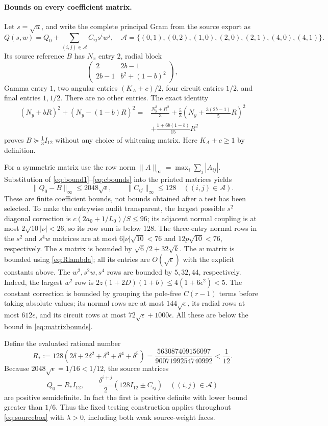 \paragraph{Bounds on every coefficient matrix.}
Let $s=\sqrt u$, and write the complete principal Gram from the
source export as
\[
 Q(s,w)=Q_0+\sum_{(i,j)\in\mathcal A}C_{ij}s^iw^j,
 \quad
 \mathcal A=\{(0,1),(0,2),(1,0),(2,0),(2,1),(4,0),(4,1)\}.
\]
Its source reference $B$ has $N_x$ entry $2$, radial block
\[
 \begin{pmatrix}2&2b-1\\2b-1&b^2+(1-b)^2\end{pmatrix},
\]
Gamma entry $1$, two angular entries $(K_A+c)/2$, four circuit
entries $1/2$, and final entries $1,1/2$. There are no other
entries. The exact identity
\begin{align*}
 (N_y+bR)^2+(N_y-(1-b)R)^2
 ={}&\frac{N_y^2+R^2}{3}
 +\frac53\left(N_y+\frac{3(2b-1)}5R\right)^2\\
 &+\frac{1+6b(1-b)}{15}R^2
\end{align*}
proves $B\succeq\frac13I_{12}$ without any choice of whitening matrix.
Here $K_A+c\ge1$ by definition.

For a symmetric matrix use the row norm
$\|A\|_\infty=\max_i\sum_j|A_{ij}|$.
Substitution of \eqref{eq:bound1}--\eqref{eq:cbounds} into the
printed matrices yields
\begin{equation}\label{eq:matrixbounds}
 \|Q_0-B\|_\infty\le2048\sqrt\epsilon,\qquad
 \|C_{ij}\|_\infty\le128\quad((i,j)\in\mathcal A).
\end{equation}
These are finite coefficient bounds, not bounds obtained after a test
has been selected. To make the entrywise audit transparent, the
largest possible $s^2$ diagonal correction is
$c(2a_0+1/L_0)/S\le96$; its adjacent normal coupling is at most
$2\sqrt{10}|\nu|<26$, so its row sum is below $128$.
The three-entry normal rows in the $s^2$ and $s^4w$ matrices are at
most $6|\nu|\sqrt{10}<76$ and $12p\sqrt{10}<76$, respectively.
The $s$ matrix is bounded by $\sqrt6/2+32\sqrt{k}$.
The $w$ matrix is bounded using \eqref{eq:Rlambda}; all its entries
are $O(\sqrt\epsilon)$ with the explicit constants above.
The $w^2,s^2w,s^4$ rows are bounded by $5,32,44$, respectively.
Indeed, the largest $w^2$ row is
$2z(1+2D)(1+b)\le4(1+6\epsilon^2)<5$.
The constant correction is bounded by grouping the pole-free
$C(r-1)$ terms before taking absolute values; its normal rows are
at most $144\sqrt\epsilon$, its radial rows at most $612\epsilon$,
and its circuit rows at most $72\sqrt\epsilon+1000\epsilon$.
All these are below the bound in \eqref{eq:matrixbounds}.

Define the evaluated rational number
\[
 R_*:=128(2\delta+2\delta^2+\delta^3+\delta^4+\delta^5)
 =\frac{563087409156097}{9007199254740992}<\frac1{12}.
\]
Because $2048\sqrt\epsilon=1/16<1/12$, the source matrices
\begin{equation}\label{eq:sourcePSDblocks}
 Q_0-R_*I_{12},\qquad
 \frac{\delta^{i+j}}2(128I_{12}\pm C_{ij})
 \quad((i,j)\in\mathcal A)
\end{equation}
are positive semidefinite. In fact the first is positive definite
with lower bound greater than $1/6$. Thus the fixed testing
construction applies throughout \eqref{eq:sourcebox} with
$\lambda>0$, including both weak source-weight faces.
